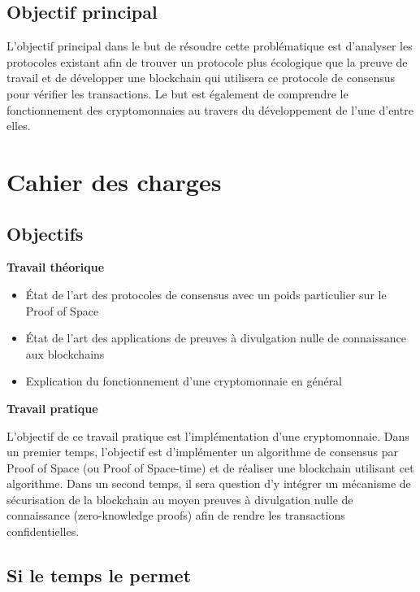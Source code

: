 \subsection*{Objectif principal}

L'objectif principal dans le but de résoudre cette problématique est d'analyser les protocoles existant afin de trouver un protocole plus écologique que la preuve de travail et de développer une blockchain qui utilisera ce protocole de consensus pour vérifier les transactions. Le but est également de comprendre le fonctionnement des cryptomonnaies au travers du développement de l'une d'entre elles.


\section*{Cahier des charges}

\subsection*{Objectifs}

\textbf{Travail théorique}
\begin{itemize}
    \item État de l'art des protocoles de consensus avec un poids particulier sur le Proof of Space
    \item État de l'art des applications de preuves à divulgation nulle de connaissance aux blockchains
    \item Explication du fonctionnement d'une cryptomonnaie en général
\end{itemize}

\textbf{Travail pratique}

L'objectif de ce travail pratique est l'implémentation d'une cryptomonnaie.
Dans un premier temps, l'objectif est d'implémenter un algorithme de consensus par Proof of Space (ou Proof of Space-time) et de réaliser une blockchain utilisant cet algorithme.
Dans un second temps, il sera question d'y intégrer un mécanisme de sécurisation de la blockchain au moyen preuves à divulgation nulle de connaissance (zero-knowledge proofs) afin de rendre les transactions confidentielles.

\subsection*{Si le temps le permet}

